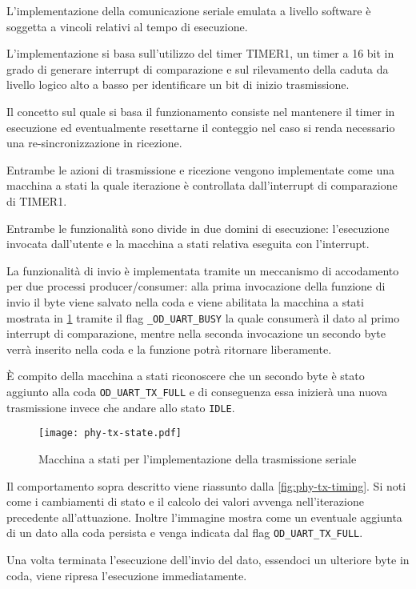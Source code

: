 L'implementazione della comunicazione seriale emulata a livello software è soggetta a vincoli relativi al tempo di esecuzione.

L'implementazione si basa sull'utilizzo del timer TIMER1, un timer a 16 bit in grado di generare interrupt di comparazione e sul rilevamento della caduta da livello logico alto a basso per identificare un bit di inizio trasmissione.

Il concetto sul quale si basa il funzionamento consiste nel mantenere il timer in esecuzione ed eventualmente resettarne il conteggio nel caso si renda necessario una re-sincronizzazione in ricezione.

Entrambe le azioni di trasmissione e ricezione vengono implementate come una macchina a stati la quale iterazione è controllata dall'interrupt di comparazione di TIMER1.

Entrambe le funzionalità sono divide in due domini di esecuzione: l'esecuzione invocata dall'utente e la macchina a stati relativa eseguita con l'interrupt. 

La funzionalità di invio è implementata tramite un meccanismo di accodamento per due processi producer/consumer: alla prima invocazione della funzione di invio il byte viene salvato nella coda e viene abilitata la macchina a stati mostrata in \cref{fig:phy-state-tx} tramite il flag \texttt{\_OD\_UART\_BUSY} la quale consumerà il dato al primo interrupt di comparazione, mentre nella seconda invocazione un secondo byte verrà inserito nella coda e la funzione potrà ritornare liberamente. 

È compito della macchina a stati riconoscere che un secondo byte è stato aggiunto alla coda \texttt{OD\_UART\_TX\_FULL} e di conseguenza essa inizierà una nuova trasmissione invece che andare allo stato \texttt{IDLE}.

\begin{figure}[t]
    \centering
    \texttt{[image: phy-tx-state.pdf]}
    \caption[]{Macchina a stati per l'implementazione della trasmissione seriale}\label{fig:phy-state-tx}
\end{figure}

Il comportamento sopra descritto viene riassunto dalla \cref{fig:phy-tx-timing}. Si noti come i cambiamenti di stato e il calcolo dei valori avvenga nell'iterazione precedente all'attuazione.
Inoltre l'immagine mostra come un eventuale aggiunta di un dato alla coda persista e venga indicata dal flag \texttt{OD\_UART\_TX\_FULL}.

Una volta terminata l'esecuzione dell'invio del dato, essendoci un ulteriore byte in coda, viene ripresa l'esecuzione immediatamente.

